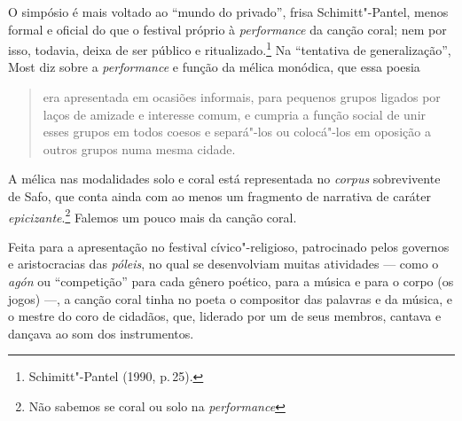 O simpósio é mais voltado ao “mundo do privado”, frisa Schimitt"-Pantel, menos
formal e oficial do que o festival próprio à \emph{performance}
da canção coral; nem por isso, todavia, deixa de ser público e
ritualizado.\footnote{ Schimitt"-Pantel (1990, p.\,25).} Na
“tentativa de generalização”, Most diz sobre a \emph{performance} e função da
mélica monódica, que essa poesia 

\begin{quote}
era apresentada em ocasiões informais, para
pequenos grupos ligados por laços de amizade e interesse comum, e cumpria a
função social de unir esses grupos em todos coesos e separá"-los ou colocá"-los
em oposição a outros grupos numa mesma cidade.
\end{quote}

A mélica nas modalidades solo e coral está representada no \emph{corpus} sobrevivente
de Safo, que conta ainda com ao menos um fragmento de narrativa de
caráter \emph{epicizante}.\footnote{Não sabemos se coral ou solo na \emph{performance}} 
Falemos um pouco mais da canção coral.

Feita para a apresentação no festival cívico"-religioso, patrocinado
pelos governos e aristocracias das \emph{póleis}, no qual se
desenvolviam muitas atividades --- como o \emph{agón} ou ``competição'' 
para cada gênero poético, para a música e para o corpo (os jogos) ---, a canção coral tinha no poeta o compositor das palavras e
da música, e o mestre do coro de cidadãos, que, liderado por um de seus
membros, cantava e dançava ao som dos instrumentos.


